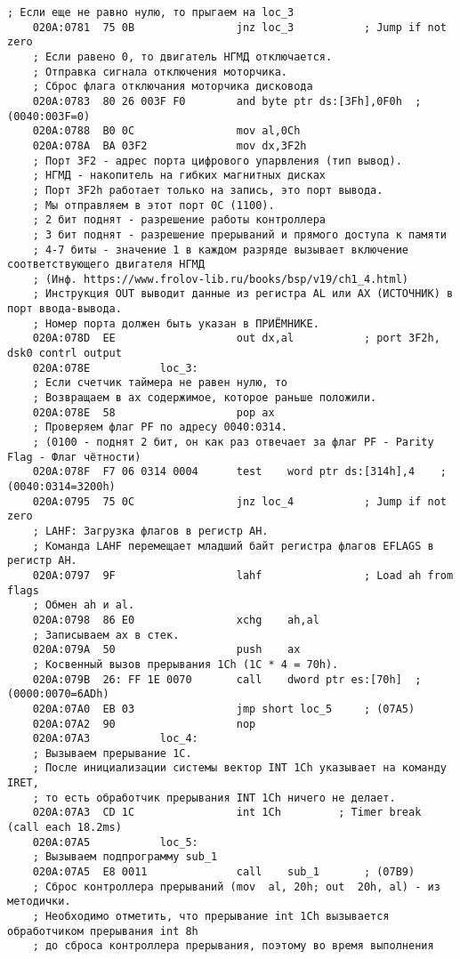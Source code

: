 \documentclass[12pt,a4paper]{report}
\begin{document}
\begin{lstlisting}[label=some-code,caption=Код прерывания INT 8h]
    ; Если еще не равно нулю, то прыгаем на loc_3
    020A:0781  75 0B				jnz	loc_3			; Jump if not zero
    ; Если равено 0, то двигатель НГМД отключается.
    ; Отправка сигнала отключения моторчика.
    ; Сброс флага отключания моторчика дисковода
    020A:0783  80 26 003F F0		and	byte ptr ds:[3Fh],0F0h	; (0040:003F=0)
    020A:0788  B0 0C				mov	al,0Ch
    020A:078A  BA 03F2				mov	dx,3F2h
    ; Порт 3F2 - адрес порта цифрового упарвления (тип вывод).
    ; НГМД - накопитель на гибких магнитных дисках
    ; Порт 3F2h работает только на запись, это порт вывода.
    ; Мы отправляем в этот порт 0C (1100).
    ; 2 бит поднят - разрешение работы контроллера
    ; 3 бит поднят - разрешение прерываний и прямого доступа к памяти
    ; 4-7 биты - значение 1 в каждом разряде вызывает включение соответствующего двигателя НГМД
    ; (Инф. https://www.frolov-lib.ru/books/bsp/v19/ch1_4.html)
    ; Инструкция OUT выводит данные из регистра AL или AX (ИСТОЧНИК) в порт ввода-вывода. 
    ; Номер порта должен быть указан в ПРИЁМНИКЕ.
    020A:078D  EE					out	dx,al			; port 3F2h, dsk0 contrl output
    020A:078E			loc_3:
    ; Если счетчик таймера не равен нулю, то
    ; Возвращаем в ax содержимое, которое раньше положили.
    020A:078E  58					pop	ax
    ; Проверяем флаг PF по адресу 0040:0314. 
    ; (0100 - поднят 2 бит, он как раз отвечает за флаг PF - Parity Flag - Флаг чётности)
    020A:078F  F7 06 0314 0004		test	word ptr ds:[314h],4	; (0040:0314=3200h)
    020A:0795  75 0C				jnz	loc_4			; Jump if not zero
    ; LAHF: Загрузка флагов в регистр АН.  
    ; Команда LAHF перемещает младший байт регистра флагов EFLAGS в регистр AH.
    020A:0797  9F					lahf				; Load ah from flags
    ; Обмен ah и al.
    020A:0798  86 E0				xchg	ah,al
    ; Записываем ax в стек.
    020A:079A  50					push	ax
    ; Косвенный вызов прерывания 1Ch (1C * 4 = 70h).
    020A:079B  26: FF 1E 0070		call	dword ptr es:[70h]	; (0000:0070=6ADh)
    020A:07A0  EB 03				jmp	short loc_5		; (07A5)
    020A:07A2  90					nop
    020A:07A3			loc_4:
    ; Вызываем прерывание 1C.
    ; После инициализации системы вектор INT 1Ch указывает на команду IRET, 
    ; то есть обработчик прерывания INT 1Ch ничего не делает.
    020A:07A3  CD 1C				int	1Ch			; Timer break (call each 18.2ms)
    020A:07A5			loc_5:
    ; Вызываем подпрограмму sub_1
    020A:07A5  E8 0011				call	sub_1		; (07B9)
    ; Сброс контроллера прерываний (mov  al, 20h; out  20h, al) - из методички.
    ; Необходимо отметить, что прерывание int 1Ch вызывается обработчиком прерывания int 8h
    ; до сброса контроллера прерывания, поэтому во время выполнения

\end{lstlisting}
\end{document}
